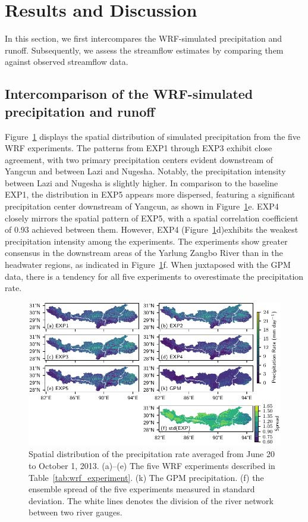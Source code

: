 \documentclass[draft]{agujournal2019}
\begin{document}
\section{Results and Discussion}
\label{sec:results}

In this section, we first intercompares the WRF-simulated precipitation and runoff. Subsequently, we assess the streamflow estimates by comparing them against observed streamflow data.

\subsection{Intercomparison of the WRF-simulated precipitation and runoff}

Figure~\ref{fig:prdist} displays the spatial distribution of simulated precipitation from the five WRF experiments. The patterns from EXP1 through EXP3 exhibit close agreement, with two primary precipitation centers evident downstream of Yangcun and between Lazi and Nugesha. Notably, the precipitation intensity between Lazi and Nugesha is slightly higher. In comparison to the baseline EXP1, the distribution in EXP5 appears more dispersed, featuring a significant precipitation center downstream of Yangcun, as shown in Figure~\ref{fig:prdist}e. EXP4 closely mirrors the spatial pattern of EXP5, with a spatial correlation coefficient of 0.93 achieved between them. However, EXP4 (Figure~\ref{fig:prdist}d)exhibits the weakest precipitation intensity among the experiments. The experiments show greater consensus in the downstream areas of the Yarlung Zangbo River than in the headwater regions, as indicated in Figure~\ref{fig:prdist}f. When juxtaposed with the GPM data, there is a tendency for all five experiments to overestimate the precipitation rate.

\begin{figure}[h!]
      \centering
      \noindent\includegraphics[width=140mm]{prrn_prdist.pdf}
      \caption{Spatial distribution of the precipitation rate averaged from June 20 to October 1, 2013. (a)--(e) The five WRF experiments described in Table~\ref{tab:wrf_experiment}. (k) The GPM precipitation. (f) the ensemble spread of the five experiments measured in standard deviation. The white lines denotes the division of the river network between two river gauges. \label{fig:prdist}}
\end{figure}
\end{document}
